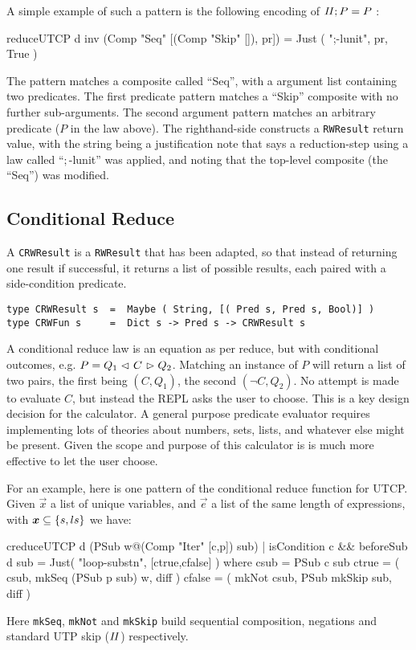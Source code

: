A simple example of such a pattern is the following encoding
of $\mathit{II};P = P$ :
\begin{code}
reduceUTCP d inv (Comp "Seq" [(Comp "Skip" []), pr])
   =  Just ( ";-lunit", pr, True )
\end{code}
The pattern
matches a composite called ``Seq'',
with a argument list containing two predicates.
The first predicate pattern
matches a ``Skip'' composite with no further sub-arguments.
The second argument pattern matches an arbitrary predicate
($P$ in the law above).
The righthand-side constructs a \texttt{RWResult} return value,
with the string being a justification note that says a reduction-step
using a law called ``$;$-lunit'' was applied,
and noting that the top-level composite (the ``Seq'') was modified.


\subsection{Conditional Reduce}

A \texttt{CRWResult} is a \texttt{RWResult} that has been adapted,
so that instead of returning one result if successful,
it returns a list of possible results,
each paired with a side-condition predicate.
\begin{verbatim}
type CRWResult s  =  Maybe ( String, [( Pred s, Pred s, Bool)] )
type CRWFun s     =  Dict s -> Pred s -> CRWResult s
\end{verbatim}
A conditional reduce law is an equation as per reduce,
but with conditional outcomes, e.g. $P = Q_1 \mathrel{\lhd ~ {C} ~ \rhd} Q_2$.
Matching an instance of $P$ will return a list of two pairs,
the first being $(C,Q_1)$, the second $(\lnot C,Q_2)$.
No attempt is made to evaluate $C$, but instead the REPL
asks the user to choose.
This is a key design decision for the calculator.
A general purpose predicate evaluator requires implementing
lots of theories about numbers, sets, lists,
and whatever else might be present.
Given the scope and purpose of this calculator is is
much more effective to let the user choose.

For an example,
here is one pattern of the conditional reduce
function for UTCP.
Given $\vec x$ a list of unique variables,
and $\vec e$ a list of the same length of expressions,
with $\vec x \subseteq \setof{s,ls}$
we have:
\begin{code}
creduceUTCP d (PSub w@(Comp "Iter" [c,p]) sub)
 | isCondition c && beforeSub d sub
 = Just( "loop-substn", [ctrue,cfalse] )
 where
   csub = PSub c sub
   ctrue  = (       csub, mkSeq (PSub p sub) w, diff )
   cfalse = ( mkNot csub, PSub mkSkip sub, diff )
\end{code}
Here \texttt{mkSeq}, \texttt{mkNot} and \texttt{mkSkip} build sequential composition,
negations and standard UTP skip ($\mathit{II}$) respectively.




